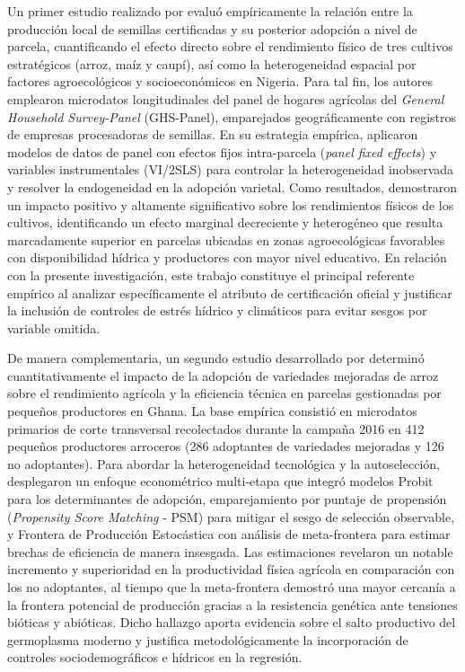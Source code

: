 \documentclass[11pt,a4paper,twocolumn]{article}
\begin{document}
Un primer estudio realizado por \citet{takeshima2025} evaluó empíricamente la relación entre la producción local de semillas certificadas y su posterior adopción a nivel de parcela, cuantificando el efecto directo sobre el rendimiento físico de tres cultivos estratégicos (arroz, maíz y caupí), así como la heterogeneidad espacial por factores agroecológicos y socioeconómicos en Nigeria. Para tal fin, los autores emplearon microdatos longitudinales del panel de hogares agrícolas del \textit{General Household Survey-Panel} (GHS-Panel), emparejados geográficamente con registros de empresas procesadoras de semillas. En su estrategia empírica, aplicaron modelos de datos de panel con efectos fijos intra-parcela (\textit{panel fixed effects}) y variables instrumentales (VI/2SLS) para controlar la heterogeneidad inobservada y resolver la endogeneidad en la adopción varietal. Como resultados, demostraron un impacto positivo y altamente significativo sobre los rendimientos físicos de los cultivos, identificando un efecto marginal decreciente y heterogéneo que resulta marcadamente superior en parcelas ubicadas en zonas agroecológicas favorables con disponibilidad hídrica y productores con mayor nivel educativo. En relación con la presente investigación, este trabajo constituye el principal referente empírico al analizar específicamente el atributo de certificación oficial y justificar la inclusión de controles de estrés hídrico y climáticos para evitar sesgos por variable omitida.

De manera complementaria, un segundo estudio desarrollado por \citet{abdul2021} determinó cuantitativamente el impacto de la adopción de variedades mejoradas de arroz sobre el rendimiento agrícola y la eficiencia técnica en parcelas gestionadas por pequeños productores en Ghana. La base empírica consistió en microdatos primarios de corte transversal recolectados durante la campaña 2016 en 412 pequeños productores arroceros (286 adoptantes de variedades mejoradas y 126 no adoptantes). Para abordar la heterogeneidad tecnológica y la autoselección, desplegaron un enfoque econométrico multi-etapa que integró modelos Probit para los determinantes de adopción, emparejamiento por puntaje de propensión (\textit{Propensity Score Matching} - PSM) para mitigar el sesgo de selección observable, y Frontera de Producción Estocástica con análisis de meta-frontera para estimar brechas de eficiencia de manera insesgada. Las estimaciones revelaron un notable incremento y superioridad en la productividad física agrícola en comparación con los no adoptantes, al tiempo que la meta-frontera demostró una mayor cercanía a la frontera potencial de producción gracias a la resistencia genética ante tensiones bióticas y abióticas. Dicho hallazgo aporta evidencia sobre el salto productivo del germoplasma moderno y justifica metodológicamente la incorporación de controles sociodemográficos e hídricos en la regresión.
\end{document}
